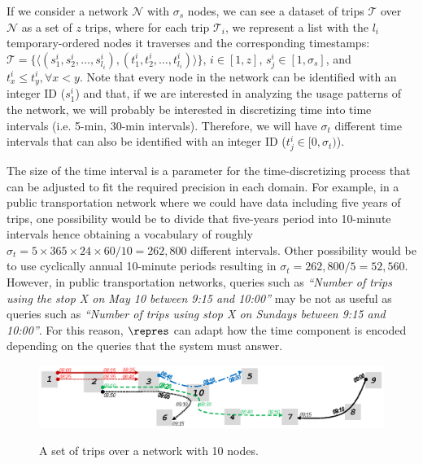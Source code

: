 If we consider a network $\mathcal{N}$ with $\sigma_s$ nodes, 
we can see a dataset of trips $\mathcal{T}$ over $\mathcal{N}$ as 
a set of $z$ trips, where for each trip $\mathcal{T}_i$, we represent a list with the $l_i$ 
temporary-ordered nodes it traverses and the corresponding timestamps: 
$\mathcal{T}= \{ \langle (s^i_1, s^i_2, \dots,  s^i_{l_i}),(t^i_1, t^i_2, \dots,  t^i_{l_i}) \rangle\}$, $i\in[1,z]$, 
$s^i_j \in [1,\sigma_s]$, and $t^i_{x} \leq t^i_y, \forall x < y$. 
Note that every node in the network can be identified with an integer ID ($s^i_1$) and that, if we are interested in
analyzing the usage patterns of the network, we will probably be interested in discretizing time into 
time intervals (i.e. 5-min, 30-min intervals). Therefore,
we will have $\sigma_t$ different time intervals that can also be identified with an
integer ID ($t^i_j \in [0,\sigma_t)$).

The size of the time interval is a parameter for the time-discretizing process
that can be adjusted to fit the required precision in each domain.
For example, in a public
transportation network where we could have data including five years of trips, one
possibility would be to divide that five-years period into
10-minute intervals hence obtaining a
vocabulary of roughly $\sigma_t=5\times 365 \times 24 \times 60/10 = 262,800$ different intervals. 
Other possibility would
be to use cyclically annual 10-minute periods resulting in $\sigma_t=262,800 / 5 = 52,560$. 
However,  in public transportation networks, queries such
as \textit{``Number of trips using the stop X on May 10 between 9:15 and 10:00''} may be not 
as useful as queries such as \textit{``Number of trips using stop X on Sundays between 9:15 and
	10:00''}.
For this reason, $\repres$ can adapt how the
time component is encoded depending on the queries that the system must answer.


\begin{figure}[ht]
	\begin{center}
		{\includegraphics[width=1\textwidth]{figures/network.eps}}  %
	\end{center}
	\vspace{-0.2cm}
	\caption{A set of trips over a network with 10 nodes.}
	\label{fig:network}
\end{figure}


